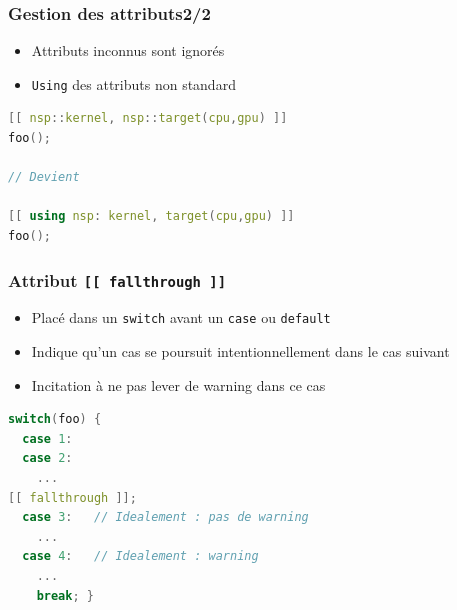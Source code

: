 \documentclass[C++.tex]{subfiles}
\begin{document}
\begin{frame}[fragile]
	\frametitle{Gestion des attributs\titlehfill{}2/2}
	\begin{itemize}
		\item Attributs inconnus sont ignorés
	

		\item \lstinline|Using| des attributs non standard
	\end{itemize}

	\begin{lstlisting}[language=C++]
[[ nsp::kernel, nsp::target(cpu,gpu) ]]
foo();

// Devient

[[ using nsp: kernel, target(cpu,gpu) ]]
foo();\end{lstlisting}
\end{frame}

\begin{frame}[fragile]
	\frametitle{Attribut \lstinline|[[ fallthrough ]]|}
	\begin{itemize}
		\item Placé dans un \lstinline|switch| avant un \lstinline|case| ou \lstinline|default|
		\item Indique qu'un cas se poursuit intentionnellement dans le cas suivant
		\item Incitation à ne pas lever de warning dans ce cas
	\end{itemize}


	\begin{lstlisting}[language=C++]
switch(foo) {
  case 1:
  case 2:
    ...
[[ fallthrough ]];
  case 3:   // Idealement : pas de warning
    ...
  case 4:   // Idealement : warning
    ...
    break; }\end{lstlisting}

\end{frame}
\end{document}
